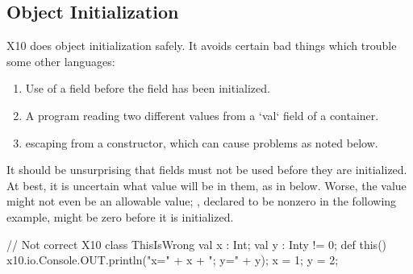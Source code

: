 \subsection{Object Initialization}
\label{ObjectInitialization}


X10 does object initialization safely.  It avoids certain bad things which
trouble some other languages:
\begin{enumerate}
\item Use of a field before the field has been initialized.
\item A program reading two different values from a \xcd`val` field of a
      container. 
\item {} escaping from a constructor, which can cause problems as
      noted below. 

\end{enumerate}

It should be unsurprising that fields must not be used before they are
initialized. At best, it is uncertain what value will be in them, as in
 below. Worse, the value might not even be an allowable value; ,
declared to be nonzero in the following example, might be zero before it is
initialized.
\begin{xten}
// Not correct X10
class ThisIsWrong {
  val x : Int;
  val y : Int{y != 0};
  def this() {
    x10.io.Console.OUT.println("x=" + x + "; y=" + y);
    x = 1; y = 2;
  }
}
\end{xten}

